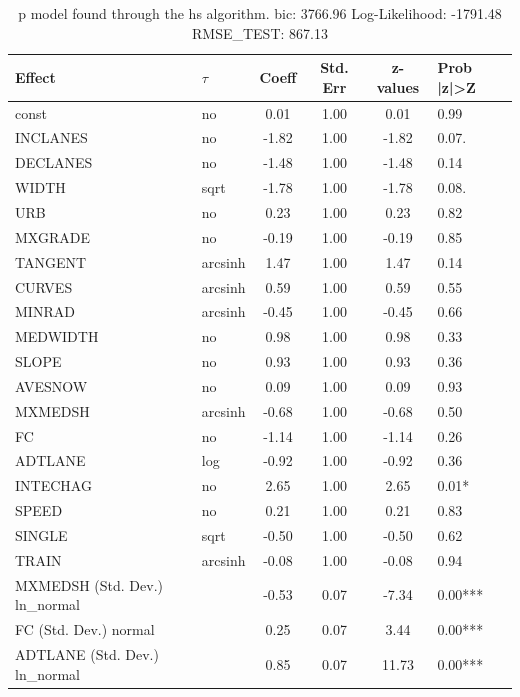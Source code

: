 \begin{table}
	\caption{p model found through the hs algorithm. bic: 3766.96 Log-Likelihood: -1791.48 RMSE_TEST: 867.13}
	\begin{center}
		\begin{tabular}{|l|l|c|c|c|l|}
			\hline
			Effect & $\tau$ & Coeff & Std. Err & z-values & Prob |z|>Z \\
			\hline
			const & no & 0.01 & 1.00 & 0.01 & 0.99 \\
			\hline
			INCLANES & no & -1.82 & 1.00 & -1.82 & 0.07. \\
			\hline
			DECLANES & no & -1.48 & 1.00 & -1.48 & 0.14 \\
			\hline
			WIDTH & sqrt & -1.78 & 1.00 & -1.78 & 0.08. \\
			\hline
			URB & no & 0.23 & 1.00 & 0.23 & 0.82 \\
			\hline
			MXGRADE & no & -0.19 & 1.00 & -0.19 & 0.85 \\
			\hline
			TANGENT & arcsinh & 1.47 & 1.00 & 1.47 & 0.14 \\
			\hline
			CURVES & arcsinh & 0.59 & 1.00 & 0.59 & 0.55 \\
			\hline
			MINRAD & arcsinh & -0.45 & 1.00 & -0.45 & 0.66 \\
			\hline
			MEDWIDTH & no & 0.98 & 1.00 & 0.98 & 0.33 \\
			\hline
			SLOPE & no & 0.93 & 1.00 & 0.93 & 0.36 \\
			\hline
			AVESNOW & no & 0.09 & 1.00 & 0.09 & 0.93 \\
			\hline
			MXMEDSH & arcsinh & -0.68 & 1.00 & -0.68 & 0.50 \\
			\hline
			FC & no & -1.14 & 1.00 & -1.14 & 0.26 \\
			\hline
			ADTLANE & log & -0.92 & 1.00 & -0.92 & 0.36 \\
			\hline
			INTECHAG & no & 2.65 & 1.00 & 2.65 & 0.01* \\
			\hline
			SPEED & no & 0.21 & 1.00 & 0.21 & 0.83 \\
			\hline
			SINGLE & sqrt & -0.50 & 1.00 & -0.50 & 0.62 \\
			\hline
			TRAIN & arcsinh & -0.08 & 1.00 & -0.08 & 0.94 \\
			\hline
			MXMEDSH (Std. Dev.) ln_normal &  & -0.53 & 0.07 & -7.34 & 0.00*** \\
			\hline
			FC (Std. Dev.) normal &  & 0.25 & 0.07 & 3.44 & 0.00*** \\
			\hline
			ADTLANE (Std. Dev.) ln_normal &  & 0.85 & 0.07 & 11.73 & 0.00*** \\

\end{tabular}
\end{center}
\end{table}
